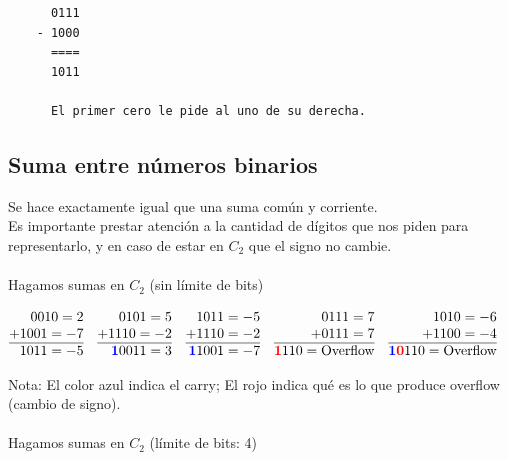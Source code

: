 \documentclass[10pt,a4paper]{article}
\begin{document}
\begin{lstlisting}
      0111
    - 1000
      ====
      1011

      El primer cero le pide al uno de su derecha.
\end{lstlisting}

\subsection*{Suma entre números binarios}
Se hace exactamente igual que una suma común y corriente. \\
Es importante prestar atención a la cantidad de dígitos que nos piden para representarlo, y en caso de estar en \(C_{2}\) que el signo no cambie.\\ 
\\
Hagamos sumas en \(C_{2}\) (sin límite de bits)

\begin{align*}
    &\begin{array}{@{} r@{}}
      0010 = 2 \\
    + 1001 = -7\\
    \hline
    \ 1011 = -5
    \end{array}
    &&
    \begin{array}{@{} r @{}}
       0101 = 5 \\
    + 1110 = -2 \\
    \hline
    \textcolor{blue}{\textbf{1}}0011 = 3
    \end{array}
    &&
    \begin{array}{@{} r @{}}
       1011 = -5 \\
    + 1110 = -2 \\
    \hline
    \textcolor{blue}{\textbf{1}}1001 = -7
    \end{array}
    &&
    \begin{array}{@{} r @{}}
       0111 = 7 \\
    + 0111 = 7\\
    \hline
    \textcolor{red}{\textbf{1}}110 = \text{Overflow}
    \end{array}
    &&
    \begin{array}{@{} r @{}}
       1010 = -6 \\
    + 1100 = -4 \\
    \hline
    \textcolor{blue}{\textbf{1}}\textcolor{red}{\textbf{0}}110 = \text{Overflow}
    \end{array}
    \end{align*}

Nota: El color azul indica el carry; El rojo indica qué es lo que produce overflow (cambio de signo).
\\
\\
Hagamos sumas en \(C_{2}\) (límite de bits: 4)
\end{document}
